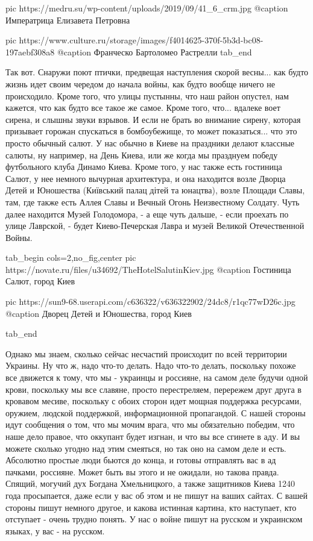 		 pic https://medru.su/wp-content/uploads/2019/09/41_6_crm.jpg
		 @caption Императрица Елизавета Петровна

		 pic https://www.culture.ru/storage/images/f4014625-370f-5b3d-bc08-197aebf308a8
		 @caption Франческо Бартоломео Растрелли
  tab_end
\fi

Так вот. Снаружи поют птички, предвещая наступления скорой весны... как будто
жизнь идет своим чередом до начала войны, как будто вообще ничего не
происходило. Кроме того, что улицы пустынны, что наш район опустел, нам
кажется, что как будто все такое же самое. Кроме того, что... вдалеке воет
сирена, и слышны звуки взрывов.  И если не брать во внимание сирену, которая
призывает горожан спускаться в бомбоубежище, то может показаться... что это
просто обычный салют. У нас обычно в Киеве на праздники делают классные салюты,
ну например, на День Киева, или же когда мы празднуем победу футбольного клуба
Динамо Киева. Кроме того, у нас также есть гостиница Салют, у нее немного
вычурная архитектура, и она находится возле Дворца Детей и Юношества (Київський
палац дітей та юнацтва), возле Площади Славы, там, где также есть Аллея Славы и
Вечный Огонь Неизвестному Солдату. Чуть далее находится Музей Голодомора, - а
еще чуть дальше, - если проехать по улице Лаврской, - будет Киево-Печерская
Лавра и музей Великой Отечественной Войны.

\ifcmt
  tab_begin cols=2,no_fig,center
		 pic https://novate.ru/files/u34692/TheHotelSalutinKiev.jpg
		 @caption Гостиница Салют, город Киев

		 pic https://sun9-68.userapi.com/c636322/v636322902/24dc8/r1qc77wD26c.jpg
		 @caption Дворец Детей и Юношества, город Киев

  tab_end
\fi

Однако мы знаем, сколько сейчас несчастий происходит по всей территории
Украины. Ну что ж, надо что-то делать. Надо что-то делать, поскольку похоже все
движется к тому, что мы - украинцы и россияне, на самом деле будучи одной
крови, поскольку мы все славяне, просто перестреляем, перережем друг друга в
кровавом месиве, поскольку с обоих сторон идет мощная поддержка ресурсами,
оружием, людской поддержкой, информационной пропагандой. С нашей стороны идут
сообщения о том, что мы мочим врага, что мы обязательно победим, что наше дело
правое, что оккупант будет изгнан, и что вы все сгинете в аду. И вы можете
сколько угодно над этим смеяться, но так оно на самом деле и есть. Абсолютно
простые люди бьются до конца, и готовы отправлять вас в ад пачками, россияне.
Может быть вы этого и не ожидали, но такова правда.  Спящий, могучий дух
Богдана Хмельницкого, а также защитников Киева 1240 года просыпается, даже если
у вас об этом и не пишут на ваших сайтах. С вашей стороны пишут немного другое,
и какова истинная картина, кто наступает, кто отступает - очень трудно понять.
У нас о войне пишут на русском и украинском языках, у вас - на русском.

